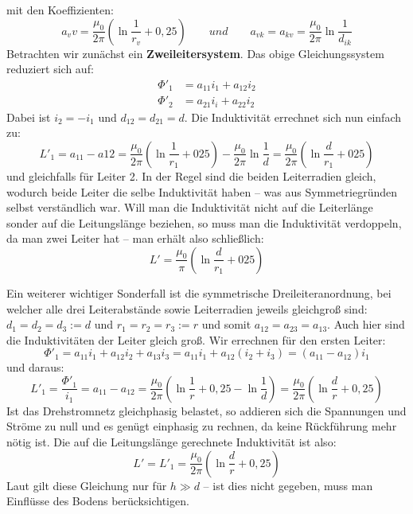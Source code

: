 mit den Koeffizienten:
\begin{equation}
a_vv = \frac{\mu_0}{2\pi} \left( \ln\frac{1}{r_v} + 0,25 \right) \qquad und \qquad a_{vk} = a_{kv} = \frac{\mu_0}{2\pi} \ln\frac{1}{d_{ik}}
\end{equation}
Betrachten wir zunächst ein \textbf{Zweileitersystem}. Das obige Gleichungssystem reduziert sich auf:
\begin{align}
\Phi'_1 &= a_{11}i_1 + a_{12}i_2 \\
\Phi'_2 &= a_{21}i_i + a_{22}i_2
\end{align}
Dabei ist $i_2 = -i_1$ und $d_{12} = d_{21} = d$. Die Induktivität errechnet sich nun einfach zu:
\begin{equation}
L'_1 = a_{11} - a{12} = \frac{\mu_0}{2\pi}\left(\ln\frac{1}{r_1}+025\right)-\frac{\mu_0}{2\pi}\ln\frac{1}{d} = 
\frac{\mu_0}{2\pi}\left(\ln\frac{d}{r_1}+025\right)
\end{equation}
und gleichfalls für Leiter 2. In der Regel sind die beiden Leiterradien gleich, wodurch beide Leiter die selbe Induktivität haben – was aus Symmetriegründen selbst verständlich war. Will man die Induktivität nicht auf die Leiterlänge sonder auf die Leitungslänge beziehen, so muss man die Induktivität verdoppeln, da man zwei Leiter hat – man erhält also schließlich:
\begin{equation}
L' = \frac{\mu_0}{\pi}\left(\ln\frac{d}{r_1}+025\right)
\end{equation}

Ein weiterer wichtiger Sonderfall ist die symmetrische Dreileiteranordnung, bei welcher alle drei Leiterabstände sowie Leiterradien jeweils gleichgroß sind: $d_1=d_2=d_3:=d$ und $r_1=r_2=r_3:=r$ und somit $a_{12}=a_{23}=a_{13}$. Auch hier sind die Induktivitäten der Leiter gleich groß. Wir errechnen für den ersten Leiter:
\begin{equation}
\Phi'_1 = a_{11}i_1+a_{12}i_2+a_{13}i_3 = a_{11}i_1+a_{12}\left(i_2+i_3\right) = \left(a_{11}-a_{12}\right)i_1
\end{equation}
und daraus:
\begin{equation}
L'_1 = \frac{\Phi'_1}{i_1} = a_{11}-a_{12} = \frac{\mu_0}{2\pi}\left(\ln\frac{1}{r}+0,25-\ln\frac{1}{d} \right) =
\frac{\mu_0}{2\pi}\left(\ln\frac{d}{r}+0,25 \right)
\end{equation}
Ist das Drehstromnetz gleichphasig belastet, so addieren sich die Spannungen und Ströme zu null und es genügt einphasig zu rechnen, da keine Rückführung mehr nötig ist. Die auf die Leitungslänge gerechnete Induktivität ist also:
\begin{equation}\label{eq:Induktivitaet3}
L' = L'_1 = \frac{\mu_0}{2\pi}\left(\ln\frac{d}{r}+0,25 \right)
\end{equation}
Laut \cite{Harrison} gilt diese Gleichung nur für $h\gg d$ – ist dies nicht gegeben, muss man Einflüsse des Bodens berücksichtigen.

